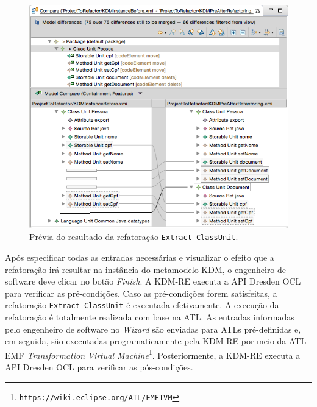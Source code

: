 \begin{figure}[h]
	\centering
	\caption{Prévia do resultado da refatoração \texttt{Extract ClassUnit}.}
	\label{fig:previa_resultado_extractClassUnit}
	\includegraphics[scale=0.5]{images/previaRefatoracaoExtractClassUnitEMFCOmpare}
	\fautor
\end{figure}


Após especificar todas as entradas necessárias e visualizar o efeito que a refatoração irá resultar na instância do metamodelo KDM, o engenheiro de software deve clicar no botão \textit{Finish}. A KDM-RE executa a API Dresden OCL para verificar as pré-condições. Caso as pré-condições forem satisfeitas, a refatoração \texttt{Extract ClassUnit} é executada efetivamente. A execução da refatoração é totalmente realizada com base na ATL. As entradas informadas pelo engenheiro de software no \textit{Wizard} são enviadas para ATLs pré-definidas e, em seguida, são executadas programaticamente pela KDM-RE por meio da ATL EMF \textit{Transformation Virtual Machine}\footnote{\texttt{https://wiki.eclipse.org/ATL/EMFTVM}}. Posteriormente, a KDM-RE  executa a API Dresden OCL para verificar as pós-condições. 


